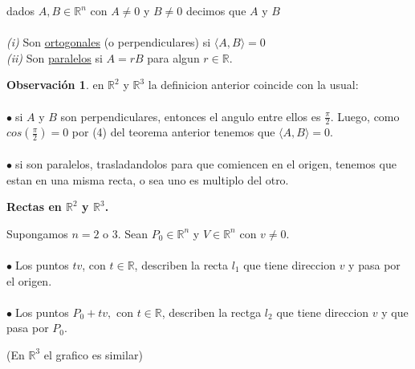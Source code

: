 \documentclass{article}
\theoremstyle{definition}
\theoremstyle{definition}
\newtheorem*{obs}{Observación}
\theoremstyle{remark}
\newcommand\bl{$\bullet\;$}
\begin{document}
\begin{defi}
  dados $A,B \in \mathbb{R}^n$ con $A \neq 0$ y $B \neq 0$ decimos que $A$ y $B$ \\\\
  \emph{(i\phantom{i})} \quad Son \underline{ortogonales} (o perpendiculares) si $\langle A,B \rangle = 0$ \\
  \emph{(ii)} \quad Son \underline{paralelos} si $A=rB$ para algun $r \in \mathbb{R}$.
\end{defi}
\begin{obs}
  en $\mathbb{R}^2$ y $\mathbb{R}^3$ la definicion anterior coincide con la usual: \\\\
  \bl si $A$ y $B$ son perpendiculares, entonces el angulo entre ellos es $\frac{\pi}{2}$. Luego, como $cos(\frac{\pi}{2})=0$ por (4) del teorema anterior tenemos que $\langle A,B \rangle = 0$. \\\\ 
  \bl si son paralelos, trasladandolos para que comiencen en el origen, tenemos que estan en una misma recta, o sea uno es multiplo del otro.
\end{obs}

\begin{figure}[h]
\centering
\def\svgwidth{0.75\textwidth}

\end{figure}

\pagebreak

\begin{center}
  \textbf{Rectas en $\mathbb{R}^2$ y $\mathbb{R}^3$.}
\end{center}
Supongamos $n=2$ o $3$. Sean $P_0 \in \mathbb{R}^n$ y $V \in \mathbb{R}^n$ con $v \neq 0$. \\ \\
\bl Los puntos $tv$, con $t \in \mathbb{R}$, describen la recta $l_1$ que tiene direccion $v$ y pasa por el origen. \\\\
\bl Los puntos $P_0 + tv,$ con $t \in \mathbb{R}$, describen la rectga $l_2$ que tiene direccion $v$ y que pasa por $P_0$.

\begin{figure}[h]
\centering
\def\svgwidth{0.75\textwidth}

\end{figure}

(En $\mathbb{R}^3$ el grafico es similar)
\end{document}
